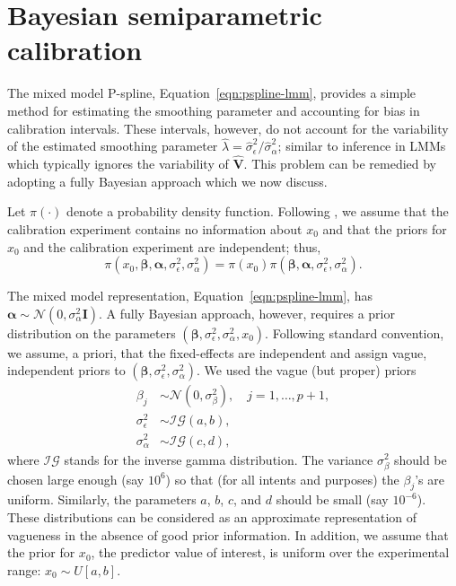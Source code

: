 \documentclass[cmfont,usenames,dvipsnames,leqno]{afit-etd}\usepackage[]{graphicx}\usepackage[]{color}
\newcommand{\mc}[1]{\ensuremath{\mathcal{#1}}}
\newcommand{\wh}[1]{\ensuremath{\widehat{#1}}}
\begin{document}
\section{Bayesian semiparametric calibration}
\label{sec:pspline-bayesian}
The mixed model \ac{P-spline}, Equation~\eqref{eqn:pspline-lmm}, provides a simple method for estimating the smoothing parameter and accounting for bias in calibration intervals. These intervals, however, do not account for the variability of the estimated smoothing parameter $\wh{\lambda} = \wh{\sigma}_\epsilon^2/\wh{\sigma}_\alpha^2$; similar to inference in \ac{LMM}s which typically ignores the variability of $\wh{\bm{V}}$. This problem can be remedied by adopting a fully Bayesian approach which we now discuss. 

Let $\pi(\cdot)$ denote a probability density function. Following \citet{hoadley_bayesian_1970}, we assume that the calibration experiment contains no information about $x_0$ and that the priors for $x_0$ and the calibration experiment are independent; thus,
\begin{equation*}
  \pi(x_0, \bm{\beta}, \bm{\alpha}, \sigma_\epsilon^2, \sigma_\alpha^2) = \pi(x_0)\pi(\bm{\beta}, \bm{\alpha}, \sigma_\epsilon^2, \sigma_\alpha^2).
\end{equation*}

The mixed model representation, Equation~\eqref{eqn:pspline-lmm}, has $\bm{\alpha} \sim \mc{N}(0, \sigma_\alpha^2\bm{I})$. A fully Bayesian approach, however, requires a prior distribution on the parameters $(\bm{\beta}, \sigma_\epsilon^2, \sigma_\alpha^2, x_0)$. Following standard convention, we assume, a priori, that the fixed-effects are independent and assign vague, independent priors to $(\bm{\beta}, \sigma_\epsilon^2, \sigma_\alpha^2)$. We used the vague (but proper) priors
\begin{align*}
  \beta_j &\sim \mc{N}\left(0, \sigma_\beta^2\right), \quad j = 1, \dotsc, p+1, \\
  \sigma_\epsilon^2 &\sim \mc{IG}\left(a, b\right), \\
  \sigma_\alpha^2 &\sim \mc{IG}\left(c, d\right),
\end{align*}
where $\mc{IG}$ stands for the inverse gamma distribution. The variance $\sigma_\beta^2$ should be chosen large enough (say $10^6$) so that (for all intents and purposes) the $\beta_j$'s are uniform. Similarly, the parameters $a$, $b$, $c$, and $d$ should be small (say $10^{-6}$). These distributions can be considered as an approximate representation of vagueness in the absence of good prior information. In addition, we assume that the prior for $x_0$, the predictor value of interest, is uniform over the experimental range: $x_0 \sim U[a, b]$. 
\end{document}
